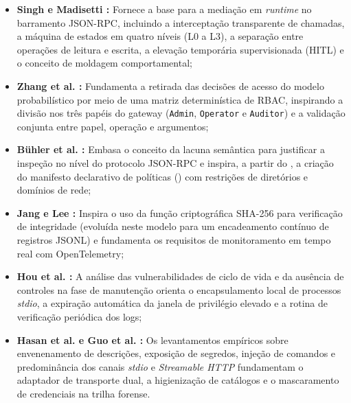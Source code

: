 \begin{itemize}
  \item \textbf{Singh e Madisetti \cite{singh2026mcpsecure}:} Fornece a base para a mediação em \textit{runtime} no barramento JSON-RPC, incluindo a interceptação transparente de chamadas, a máquina de estados em quatro níveis (L0 a L3), a separação entre operações de leitura e escrita, a elevação temporária supervisionada (HITL) e o conceito de moldagem comportamental;

  \item \textbf{Zhang et al. \cite{zhang2025acfix}:} Fundamenta a retirada das decisões de acesso do modelo probabilístico por meio de uma matriz determinística de RBAC, inspirando a divisão nos três papéis do gateway (\texttt{Admin}, \texttt{Operator} e \texttt{Auditor}) e a validação conjunta entre papel, operação e argumentos;

  \item \textbf{Bühler et al. \cite{buhler2026agentbound}:} Embasa o conceito da lacuna semântica para justificar a inspeção no nível do protocolo JSON-RPC e inspira, a partir do , a criação do manifesto declarativo de políticas () com restrições de diretórios e domínios de rede;

  \item \textbf{Jang e Lee \cite{jang2026hierarchical}:} Inspira o uso da função criptográfica SHA-256 para verificação de integridade (evoluída neste modelo para um encadeamento contínuo de registros JSONL) e fundamenta os requisitos de monitoramento em tempo real com OpenTelemetry;

  \item \textbf{Hou et al. \cite{hou2025mcp}:} A análise das vulnerabilidades de ciclo de vida e da ausência de controles na fase de manutenção orienta o encapsulamento local de processos \textit{stdio}, a expiração automática da janela de privilégio elevado e a rotina de verificação periódica dos logs;

  \item \textbf{Hasan et al. \cite{hasan2026mcp} e Guo et al. \cite{guo2025measurement}:} Os levantamentos empíricos sobre envenenamento de descrições, exposição de segredos, injeção de comandos e predominância dos canais \textit{stdio} e \textit{Streamable HTTP} fundamentam o adaptador de transporte dual, a higienização de catálogos e o mascaramento de credenciais na trilha forense.
\end{itemize}


